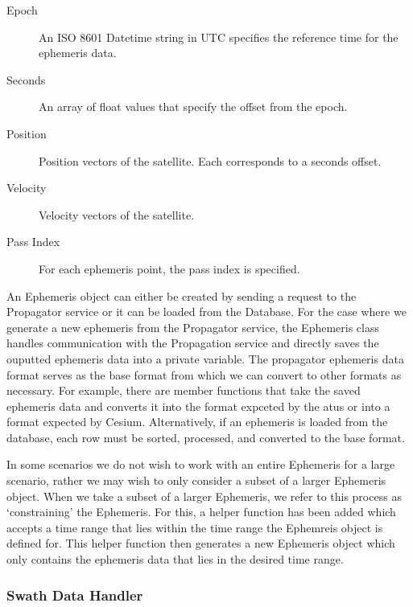 \begin{description}

    \item[Epoch] An ISO 8601 Datetime string in UTC specifies the reference
	time for the ephemeris data.

    \item[Seconds] An array of float values that specify the offset from the
	epoch.

    \item[Position] Position vectors of the satellite. Each corresponds to a
	seconds offset.

    \item[Velocity] Velocity vectors of the satellite. 

    \item[Pass Index] For each ephemeris point, the pass index is specified. 

\end{description}


An Ephemeris object can either be created by sending a request to the
Propagator service or it can be loaded from the Database. For the case where we
generate a new ephemeris from the Propagator service, the Ephemeris class
handles communication with the Propagation service and directly saves the
ouputted ephemeris data into a private variable. The propagator ephemeris data
format serves as the base format from which we can convert to other formats as
necessary. For example, there are member functions that take the saved
ephemeris data and converts it into the format expceted by the \glspl{atu} or
into a format expected by Cesium. Alternatively, if an ephemeris is loaded from
the database, each row must be sorted, processed, and converted to the base
format. 

In some scenarios we do not wish to work with an entire Ephemeris for a large
scenario, rather we may wish to only consider a subset of a larger Ephemeris
object. When we take a subset of a larger Ephemeris, we refer to this process
as `constraining' the Ephemeris. For this, a helper function has been added
which accepts a time range that lies within the time range the Ephemreis object
is defined for. This helper function then generates a new Ephemeris object
which only contains the ephemeris data that lies in the desired time range.  

\subsubsection{Swath Data Handler}

